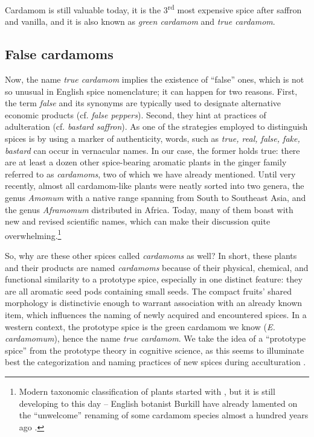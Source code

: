 \documentclass[12pt]{article}
\begin{document}

Cardamom is still valuable today, it is the 3\textsuperscript{rd} most expensive spice after saffron and vanilla, and it is also known as \textit{green cardamom} and \textit{true cardamom}. 

\subsection{False cardamoms}

Now, the name \textit{true cardamom} implies the existence of ``false'' ones, which is not so unusual in English spice nomenclature; it can happen for two reasons. First, the term \textit{false} and its synonyms are typically used to designate alternative economic products (cf. \textit{false peppers}). Second, they hint at practices of adulteration (cf. \textit{bastard saffron}). As one of the strategies employed to distinguish spices is by using a marker of authenticity, words, such as \textit{true, real, false, fake, bastard} can occur in vernacular names. In our case, the former holds true: there are at least a dozen other spice-bearing aromatic plants in the ginger family referred to as \textit{cardamoms}, two of which we have already mentioned. Until very recently, almost all cardamom-like plants were neatly sorted into two genera, the genus \textit{Amomum} with a native range spanning from South to Southeast Asia, and the genus \textit{Aframomum} distributed in Africa. Today, many of them boast with new and revised scientific names, which can make their discussion quite overwhelming.\footnote{Modern taxonomic classification of plants started with \textcite{linnaeus_1758_systema}, but it is still developing to this day -- English botanist Burkill have already lamented on the ``unwelcome'' renaming of some cardamom species almost a hundred years ago \parencite[see][]{burkill_1930_cardamoms}.}

So, why are these other spices called \textit{cardamoms} as well? In short, these plants and their products are named \textit{cardamoms} because of their physical, chemical, and functional similarity to a prototype spice, especially in one distinct feature: they are all aromatic seed pods containing small seeds. The compact fruits' shared morphology is distinctivie enough to warrant association with an already known item, which influences the naming of newly acquired and encountered spices. In a western context, the prototype spice is the green cardamom we know (\textit{E. cardamomum}), hence the name \textit{true cardamom}. We take the idea of a ``prototype spice'' from the prototype theory in cognitive science, as this seems to illuminate best the categorization and naming practices of new spices during acculturation \parencite[see][]{parti_2023_mapping}.
\end{document}
